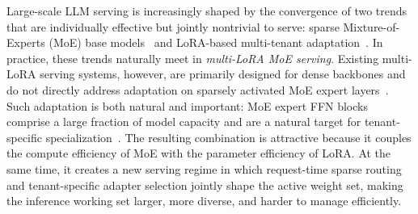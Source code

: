 \documentclass[sigplan,anonymous,review,nonacm]{acmart}
\begin{document}
Large-scale LLM serving is increasingly shaped by the convergence of two trends that are individually effective but jointly nontrivial to serve: sparse Mixture-of-Experts (MoE) base models~\cite{todo:moe-llm} and LoRA-based multi-tenant adaptation~\cite{todo:lora-original,todo:lora-serving}. In practice, these trends naturally meet in \emph{multi-LoRA MoE serving}. Existing multi-LoRA serving systems, however, are primarily designed for dense backbones and do not directly address adaptation on sparsely activated MoE expert layers~\cite{todo:lora-original,todo:lora-serving}. Such adaptation is both natural and important: MoE expert FFN blocks comprise a large fraction of model capacity and are a natural target for tenant-specific specialization~\cite{todo:moe-knowledge-capacity, schulman2025lora}. The resulting combination is attractive because it couples the compute efficiency of MoE with the parameter efficiency of LoRA. At the same time, it creates a new serving regime in which request-time sparse routing and tenant-specific adapter selection jointly shape the active weight set, making the inference working set larger, more diverse, and harder to manage efficiently.
%
\end{document}
